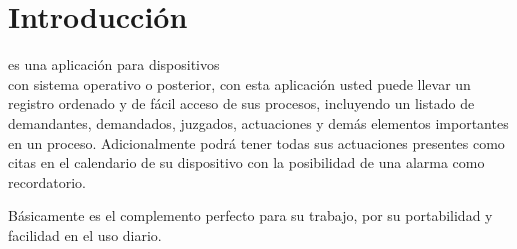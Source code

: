 \chapter{Introducci\'on}
\label{sec:intro}
\softwareAbogadosMobile es una aplicaci\'on para dispositivos \blackberry \\con
sistema operativo  o posterior, con esta aplicaci\'on usted puede llevar un
registro ordenado y de f\'acil acceso de sus procesos, incluyendo un listado de
demandantes, demandados, juzgados, actuaciones y dem\'as elementos importantes
en un proceso.
Adicionalmente podr\'a tener todas sus actuaciones presentes como citas en el
calendario de su dispositivo \blackberry con la posibilidad de una alarma como
recordatorio.

B\'asicamente \softwareAbogadosMobile es el complemento perfecto para su
trabajo, por su portabilidad y facilidad en el uso diario.